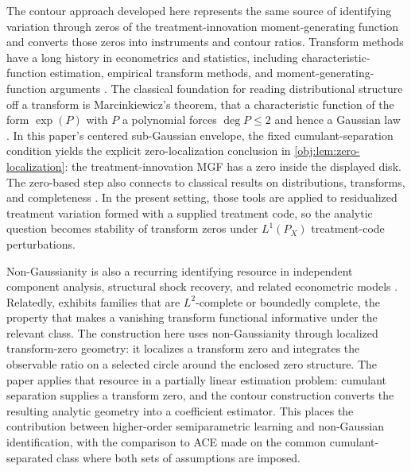 The contour approach developed here represents the same source of identifying variation through zeros of the treatment-innovation moment-generating function and converts those zeros into instruments and contour ratios. Transform methods have a long history in econometrics and statistics, including characteristic-function estimation, empirical transform methods, and moment-generating-function arguments \citep{FeuervergerMcDunnough1981,Singleton2001,ChackoViceira2003,CarrascoFlorensRenault2007,Carrasco2017}. The classical foundation for reading distributional structure off a transform is Marcinkiewicz's theorem, that a characteristic function of the form \(\exp(P)\) with \(P\) a polynomial forces \(\deg P\le2\) and hence a Gaussian law \citep{Marcinkiewicz1939}. In this paper's centered sub-Gaussian envelope, the fixed cumulant-separation condition yields the explicit zero-localization conclusion in \cref{obj:lem:zero-localization}: the treatment-innovation MGF has a zero inside the displayed disk. The zero-based step also connects to classical results on distributions, transforms, and completeness \citep{KaganLinnikRao1973,Mattner1992,DHaultfoeuille2011,DarollesFanFlorensRenault2011,HuShiu2022}. In the present setting, those tools are applied to residualized treatment variation formed with a supplied treatment code, so the analytic question becomes stability of transform zeros under \(L^1(P_X)\) treatment-code perturbations.

Non-Gaussianity is also a recurring identifying resource in independent component analysis, structural shock recovery, and related econometric models \citep{Comon1994,HyvarinenOja1997,HyvarinenKarhunenOja2001,LanneMeitzSaikkonen2017,LeeMesters2024,HoeschLeeMesters2024,ReizingerEtAl2025}. Relatedly, \citet{Andrews2017} exhibits families that are \(L^2\)-complete or boundedly complete, the property that makes a vanishing transform functional informative under the relevant class. The construction here uses non-Gaussianity through localized transform-zero geometry: it localizes a transform zero and integrates the observable ratio on a selected circle around the enclosed zero structure. The paper applies that resource in a partially linear estimation problem: cumulant separation supplies a transform zero, and the contour construction converts the resulting analytic geometry into a coefficient estimator. This places the contribution between higher-order semiparametric learning and non-Gaussian identification, with the comparison to ACE made on the common cumulant-separated class where both sets of assumptions are imposed.

